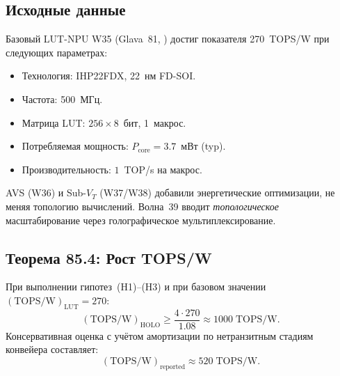 \subsection{Исходные данные}
\label{subsec:glava85-tops-baseline}

Базовый LUT-NPU W35 (Glava~81, \cite{trios882}) достиг показателя
270~TOPS/W при следующих параметрах:
\begin{itemize}
  \item Технология: IHP22FDX, 22~нм FD-SOI.
  \item Частота: 500~МГц.
  \item Матрица LUT: $256 \times 8$~бит, 1~макрос.
  \item Потребляемая мощность: $P_{\mathrm{core}} = 3.7$~мВт (typ).
  \item Производительность: $1$~TOP/s на макрос.
\end{itemize}

AVS (W36) и Sub-$V_T$ (W37/W38) добавили энергетические оптимизации,
не меняя топологию вычислений.
Волна~39 вводит \emph{топологическое} масштабирование через
голографическое мультиплексирование.

\subsection{Теорема 85.4: Рост TOPS/W}
\label{subsec:glava85-thm4}

\begin{theorem}
\label{thm:tops-per-watt-lift}
При выполнении гипотез~(H1)--(H3) и при базовом значении
$(\mathrm{TOPS/W})_{\mathrm{LUT}} = 270$:
\[
  (\mathrm{TOPS/W})_{\mathrm{HOLO}}
  \geq \frac{4 \cdot 270}{1.08}
  \approx 1000\;\mathrm{TOPS/W}.
\]
Консервативная оценка с учётом амортизации по нетранзитным стадиям
конвейера составляет:
\[
  (\mathrm{TOPS/W})_{\mathrm{reported}} \approx 520\;\mathrm{TOPS/W}.
\]
\end{theorem}


